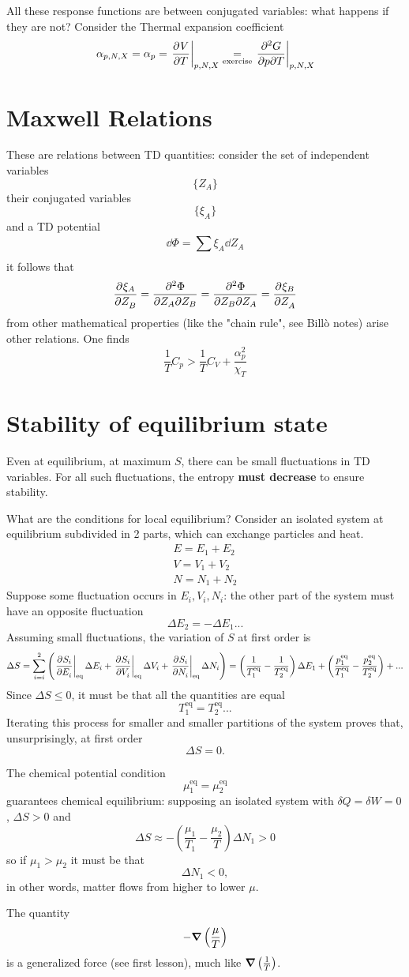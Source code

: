 All these response functions are between conjugated variables: what happens if they are
not? Consider the Thermal expansion coefficient
$$\alpha_{p,N,X} = \alpha_p = \eval{\pdv[]{V}{T}}_{p,N,X} \underset{\text{exercise}}=
\eval{\pdv[2]{G}{p}{T}}_{p,N,X}$$

\section{Maxwell Relations}
These are relations between TD quantities: consider the set of independent variables
$$\{Z_A\}$$
their conjugated variables
$$\{\xi_A\}$$
and a TD potential
$$\dd\Phi = \sum_{}^{}\xi_A\dd Z_A$$
it follows that
$$\pdv[]{\xi_A}{Z_B} = \pdv[2]{\Phi}{Z_A}{Z_B} = \pdv[2]{\Phi}{Z_B}{Z_A} =
\pdv[]{\xi_B}{Z_A}$$
from other mathematical properties (like the "chain rule", see Billò notes) arise other
relations. One finds
$$\frac{1}{T}C_p > \frac{1}{T}C_V + \frac{\alpha^2_p}{\chi_T}$$

\section{Stability of equilibrium state}
Even at equilibrium, at maximum $S$, there can be small fluctuations in TD variables.
For all such fluctuations, the entropy \textbf{must decrease} to ensure stability.

What are the conditions for local equilibrium? Consider an isolated system at
equilibrium subdivided in 2 parts, which can exchange particles and heat.
\begin{gather*}
E=E_1+E_2\\
V=V_1+V_2\\
N = N_1+N_2
\end{gather*}
Suppose some fluctuation occurs in $E_i,V_i,N_i$: the other part of the system must
have an opposite fluctuation
$$\Delta E_2 = -\Delta E_1 ...$$
Assuming small fluctuations, the variation of $S$ at first order is
$$\Delta S = \sum_{i=i}^{2} \left(\eval{\pdv[]{S_i}{E_i}}_\text{eq}\Delta E_i +
\eval{\pdv[]{S_i}{V_i}}_\text{eq}\Delta V_i + \eval{\pdv[]{S_i}{N_i}}_\text{eq}
\Delta N_i \right)=\left(\frac{1}{T_1^\text{eq}}- \frac{1}{T^\text{eq}_2}
\right)\Delta E_1 + \left(\frac{p_1^\text{eq}}{T_1^\text{eq}}-
    \frac{p_2^\text{eq}}{T^\text{eq}_2}\right) + ...$$
Since $\Delta S \leq 0$, it must be that all the quantities are equal
$$T_1^\text{eq} = T_2^\text{eq} ...$$
Iterating this process for smaller and smaller partitions of the system proves that,
unsurprisingly, at first order
$$\Delta S = 0.$$

The chemical potential condition
$$\mu^\text{eq}_1 = \mu^\text{eq}_2$$
guarantees chemical equilibrium: supposing an isolated system with 
$\delta Q = \delta W = 0$, $\Delta S>0$ and
$$\Delta S \approx - \left(\frac{\mu_1}{T_1} - \frac{\mu_2}{T}\right)\Delta N_1>0$$
so if $\mu_1>\mu_2$ it must be that
$$\Delta N_1 < 0,$$
in other words, matter flows from higher to lower $\mu$.

The quantity
$$-\gradient\left(\frac{\mu}{T}\right)$$
is a generalized force (see first lesson), much like
$\gradient \left(\frac{1}{T}\right)$.

